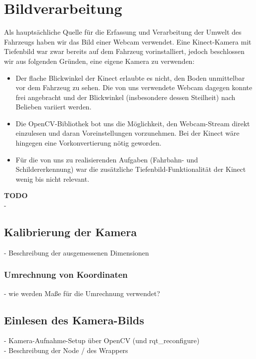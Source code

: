 \section{Bildverarbeitung}\label{sec:linien}

Als haupts\"achliche Quelle f\"ur die Erfassung und Verarbeitung der Umwelt des Fahrzeugs haben wir das Bild
einer Webcam verwendet. Eine Kinect-Kamera mit Tiefenbild war zwar bereits auf dem Fahrzeug vorinstalliert,
jedoch beschlossen wir aus folgenden Gr\"unden, eine eigene Kamera zu verwenden:
\begin{itemize}
	\item Der flache Blickwinkel der Kinect erlaubte es nicht, den Boden unmittelbar vor dem Fahrzeug
	zu sehen. Die von uns verwendete Webcam dagegen konnte frei angebracht und der Blickwinkel
	(insbesondere dessen Steilheit) nach Belieben variiert werden.
	\item Die OpenCV-Bibliothek bot uns die M\"oglichkeit, den Webcam-Stream direkt einzulesen und
	daran Voreinstellungen vorzunehmen. Bei der Kinect w\"are hingegen eine Vorkonvertierung n\"otig
	geworden.
	\item F\"ur die von uns zu realisierenden Aufgaben (Fahrbahn- und Schildererkennung) war die
	zus\"atzliche Tiefenbild-Funktionalit\"at der Kinect wenig bis nicht relevant.
\end{itemize}
\textbf{TODO}\\
-

\subsection{Kalibrierung der Kamera}

- Beschreibung der ausgemessenen Dimensionen\\

\subsubsection{Umrechnung von Koordinaten}

- wie werden Ma\ss e f\"ur die Umrechnung verwendet?

\subsection{Einlesen des Kamera-Bilds}

- Kamera-Aufnahme-Setup \"uber OpenCV (und rqt\_reconfigure)\\
- Beschreibung der Node / des Wrappers\\
